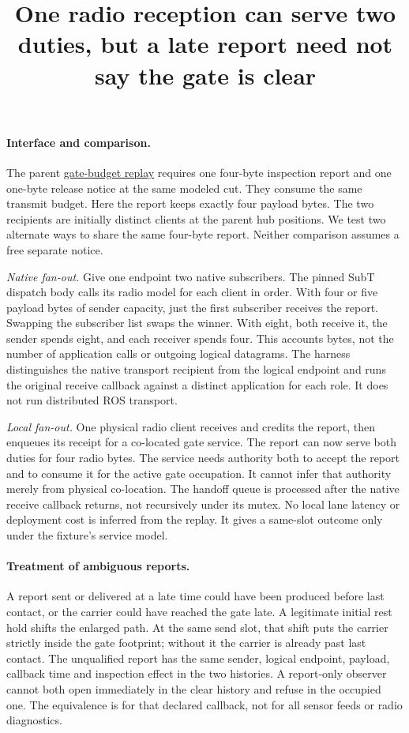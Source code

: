 \documentclass{article}
\title{One radio reception can serve two duties, but a late report need not say the gate is clear}
\author{}
\date{}
\begin{document}
\maketitle
\paragraph{Interface and comparison.}
The parent \href{https://github.com/eternal-november/eos-research-programmes/pull/808}{gate-budget replay}
requires one four-byte inspection report and one one-byte release notice at the
same modeled cut. They consume the same transmit budget. Here the report
keeps exactly four payload bytes. The two recipients are initially distinct
clients at the parent hub positions. We test two alternate ways to share the
same four-byte report. Neither comparison assumes a free separate notice.

\emph{Native fan-out.} Give one endpoint two native subscribers. The
pinned SubT dispatch body calls its radio model for each client in order.
With four or five payload bytes of sender capacity, just the first
subscriber receives the report. Swapping the subscriber list swaps the
winner. With eight, both receive it, the sender spends eight, and each
receiver spends four. This accounts bytes, not the number of application
calls or outgoing logical datagrams. The harness distinguishes the native
transport recipient from the logical endpoint and runs the original receive
callback against a distinct application for each role. It does not run
distributed ROS transport.

\emph{Local fan-out.} One physical radio client receives and credits the
report, then enqueues its receipt for a co-located gate service. The report
can now serve both duties for four radio bytes. The service needs
authority both to accept the report and to consume it for the active gate
occupation. It cannot infer that authority merely from physical
co-location. The handoff queue is processed after the native receive
callback returns, not recursively under its mutex. No local lane latency
or deployment cost is inferred from the replay. It gives a same-slot
outcome only under the fixture's service model.

\paragraph{Treatment of ambiguous reports.}
A report sent or delivered at a late time could have been produced before
last contact, or the carrier could have reached the gate late. A
legitimate initial rest hold shifts the enlarged path. At the same send
slot, that shift puts the carrier strictly inside the gate footprint;
without it the carrier is already past last contact. The unqualified
report has the same sender, logical endpoint, payload, callback time and
inspection effect in the two histories. A report-only observer cannot
both open immediately in the clear history and refuse in the occupied
one. The equivalence is for that declared callback, not for all sensor
feeds or radio diagnostics.
\end{document}
